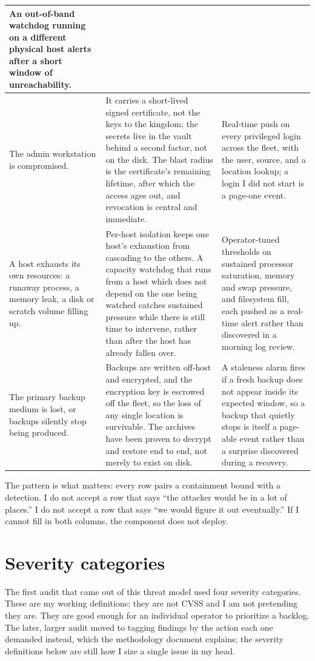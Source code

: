 \documentclass[12pt]{article}
\begin{document}
\begin{longtable}{|p{4.5cm}|p{5cm}|p{5cm}|}
An out-of-band watchdog running on a different physical host alerts after a short window of unreachability. \\
\hline
The admin workstation is compromised. &
It carries a short-lived signed certificate, not the keys to the kingdom; the secrets live in the vault behind a second factor, not on the disk. The blast radius is the certificate's remaining lifetime, after which the access ages out, and revocation is central and immediate. &
Real-time push on every privileged login across the fleet, with the user, source, and a location lookup; a login I did not start is a page-one event. \\
\hline
A host exhausts its own resources: a runaway process, a memory leak, a disk or scratch volume filling up. &
Per-host isolation keeps one host's exhaustion from cascading to the others. A capacity watchdog that runs from a host which does not depend on the one being watched catches sustained pressure while there is still time to intervene, rather than after the host has already fallen over. &
Operator-tuned thresholds on sustained processor saturation, memory and swap pressure, and filesystem fill, each pushed as a real-time alert rather than discovered in a morning log review. \\
\hline
The primary backup medium is lost, or backups silently stop being produced. &
Backups are written off-host and encrypted, and the encryption key is escrowed off the fleet, so the loss of any single location is survivable. The archives have been proven to decrypt and restore end to end, not merely to exist on disk. &
A staleness alarm fires if a fresh backup does not appear inside its expected window, so a backup that quietly stops is itself a page-able event rather than a surprise discovered during a recovery. \\
\hline
\end{longtable}

The pattern is what matters: every row pairs a containment bound with a detection. I do not accept a row that says ``the attacker would be in a lot of places.'' I do not accept a row that says ``we would figure it out eventually.'' If I cannot fill in both columns, the component does not deploy.

\section{Severity categories}

The first audit that came out of this threat model used four severity categories. These are my working definitions; they are not CVSS and I am not pretending they are. They are good enough for an individual operator to prioritize a backlog. The later, larger audit moved to tagging findings by the action each one demanded instead, which the methodology document explains; the severity definitions below are still how I size a single issue in my head.
\end{document}
